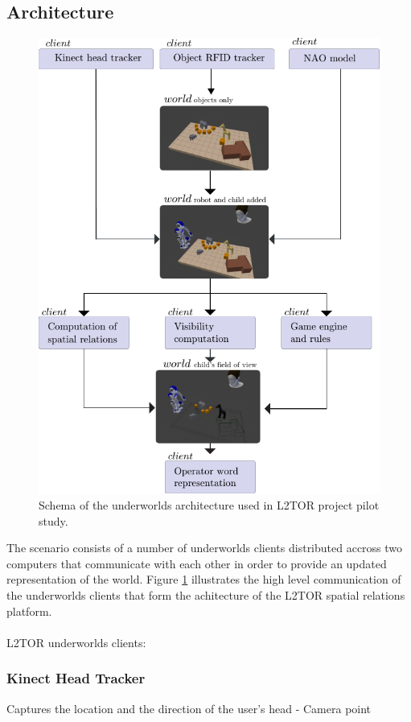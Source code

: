 \documentclass[letterpaper, 10 pt, conference]{ieeeconf}  %
\newcommand{\uwds}{{\sc underworlds}\xspace}
\begin{document}
\subsection*{Architecture}
\begin{figure}
    \centering
    \includegraphics[width=\linewidth]{l2tor-timeline}
    \caption{Schema of the \uwds architecture used in L2TOR project pilot study. }
    \label{fig|l2torarchitecture}
\end{figure}

The scenario consists of a number of \uwds clients distributed accross two computers that communicate with each other in order to provide an updated representation of the world. Figure \ref{fig|l2torarchitecture} illustrates the high level communication of the \uwds clients that form the achitecture of the L2TOR spatial relations platform.\\
\\L2TOR \uwds clients:
\subsubsection{Kinect Head Tracker} {Captures the location and the direction of the user's head - Camera point}
\end{document}
